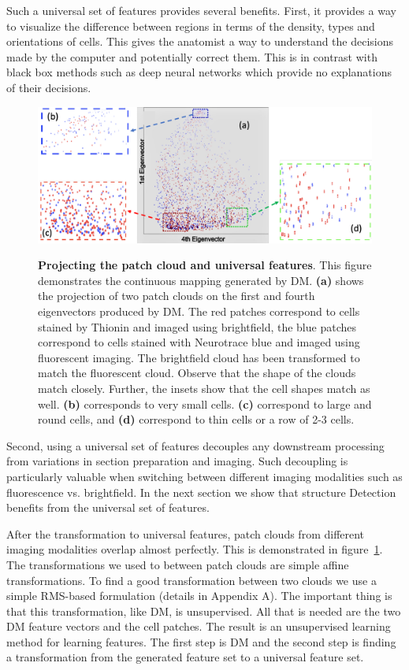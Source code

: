 \documentclass[runningheads]{llncs}
\begin{document}
Such a universal set of features provides several benefits. First, it
provides a way to visualize the difference between regions in terms of
the density, types and orientations of cells. This gives
the anatomist a way to understand the decisions made by the computer
and potentially correct them. This is in contrast with black box
methods such as deep neural networks which provide no explanations of
their decisions.

\begin{figure} [t]
  \includegraphics[width=\textwidth]{Images/Scatter.png}
\label{fig:diffusionmap}
\caption{{\bf Projecting the patch cloud and universal features}. This
  figure demonstrates the continuous mapping generated by DM. {\bf
    (a)} shows the projection of two patch clouds on the first and
  fourth eigenvectors produced by DM. The red patches correspond to
  cells stained by Thionin and imaged using brightfield, the blue
  patches correspond to cells stained with Neurotrace blue and imaged
  using fluorescent imaging. The brightfield cloud has been
  transformed to match the fluorescent cloud. Observe that the shape
  of the clouds match closely. Further, the insets show that the cell
  shapes match as well.  {\bf (b)} corresponds to very
  small cells. {\bf (c)} correspond to large and round cells, and {\bf
    (d)} correspond to thin cells or a row  of 2-3 cells.}
\end{figure}
Second, using a universal set of features decouples any downstream processing from
variations in section preparation and imaging. Such decoupling is particularly
valuable when switching between different imaging modalities such as
fluorescence vs. brightfield. In the next section we show that
structure Detection benefits from the universal set of features.

After the transformation to universal features, patch clouds from
different imaging modalities overlap almost perfectly. This is
demonstrated in figure~\ref{fig:diffusionmap}. 
The transformations we used to between patch clouds are simple affine
transformations. To find a good transformation between two clouds we
use a simple RMS-based formulation (details in Appendix A). The
important thing is that this transformation, like DM, is
unsupervised. All that is needed are the two DM feature vectors and
the cell patches. The result is an unsupervised learning method for
learning features. The first step is DM and the second step is finding
a transformation from the generated feature set to a universal feature
set.
\end{document}

